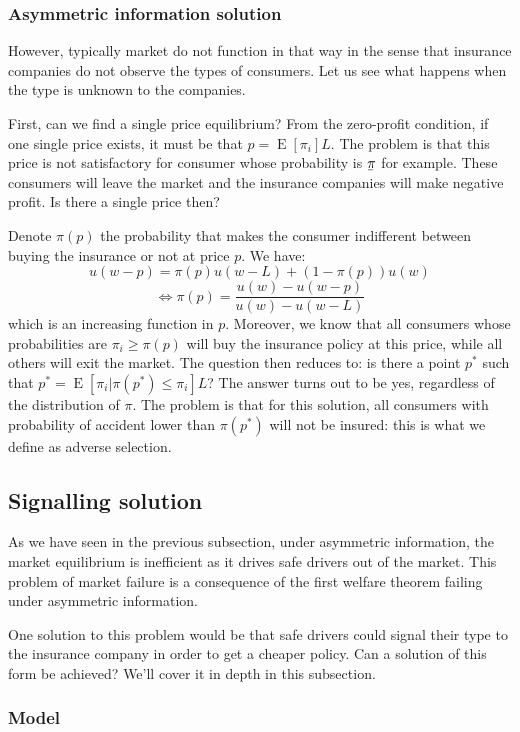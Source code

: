 \documentclass[12pt]{report}
\newcommand{\ubar}[1]{\underaccent{\bar}{#1}}
\newcommand{\E}[1]{\operatorname{E}\left[#1\right]}
\begin{document}
\subsubsection{Asymmetric information solution}

However, typically market do not function in that way in the sense that insurance companies do not observe the types of consumers. Let us see what happens when the type is unknown to the companies.

First, can we find a single price equilibrium? From the zero-profit condition, if one single price exists, it must be that $p = \E{\pi_i} L$. The problem is that this price is not satisfactory for consumer whose probability is $\ubar\pi$ for example. These consumers will leave the market and the insurance companies will make negative profit. Is there a single price then?

Denote $\pi(p)$ the probability that makes the consumer indifferent between buying the insurance or not at price $p$. We have: $$u(w - p) = \pi(p)u(w - L) + (1 - \pi(p))u(w) $$ $$\Leftrightarrow \pi(p) = \frac{u(w) - u(w-p)}{u(w) - u(w - L)} $$ which is an increasing function in $p$. Moreover, we know that all consumers whose probabilities are $\pi_i \geq \pi(p)$ will buy the insurance policy at this price, while all others will exit the market. The question then reduces to: is there a point $p^*$ such that $p^* = \E{\pi_i\vert \pi(p^*)\leq \pi_i} L $? The answer turns out to be yes, regardless of the distribution of $\pi$. The problem is that for this solution, all consumers with  probability of accident lower than $\pi(p^*)$ will not be insured: this is what we define as adverse selection.

\subsection{Signalling solution}

As we have seen in the previous subsection, under asymmetric information, the market equilibrium is inefficient as it drives safe drivers out of the market. This problem of market failure is a consequence of the first welfare theorem failing under asymmetric information.

One solution to this problem would be that safe drivers could signal their type to the insurance company in order to get a cheaper policy. Can a solution of this form be achieved? We'll cover it in depth in this subsection.

\subsubsection{Model}
\end{document}
